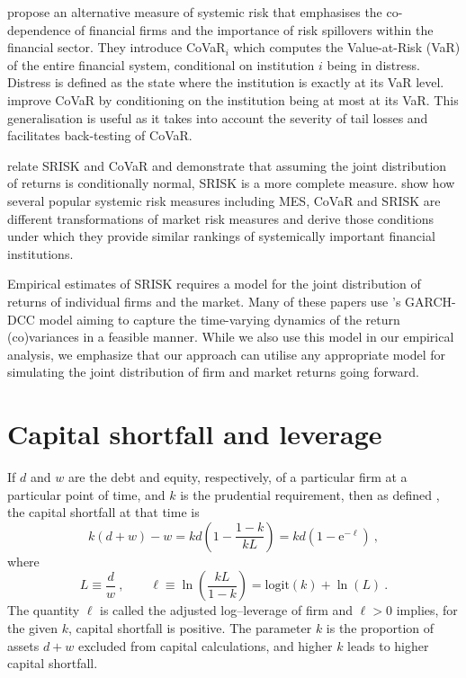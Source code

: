 \documentclass[12pt]{article}
\newcommand{\logit}{\mathrm{logit}}
\newcommand{\e}{\mathrm{e}}
\newcommand{\cq}{\ , \qquad}
\newcommand{\be}[1]{\begin{equation}\label{#1}}
\newcommand{\ee}{\end{equation}}
\begin{document}
\cite{adrian2011covar} propose an alternative measure of systemic risk that emphasises the co-dependence of financial firms and the importance of risk spillovers within the financial sector. They introduce CoVaR$_i$ which computes the Value-at-Risk (VaR) of the entire financial system, conditional on institution $i$ being in distress. Distress is defined as the state where the institution is exactly at its VaR level. \cite{Girardi2013} improve CoVaR by conditioning on the institution being at most at its VaR. This generalisation is useful as it takes into account the severity of tail losses and facilitates back-testing of CoVaR. 

\cite{acharya2012aer} relate SRISK and CoVaR and demonstrate that assuming the joint distribution of returns is conditionally normal, SRISK is a more complete measure. \cite{Benoit2013} show how several popular systemic risk measures including MES, CoVaR and SRISK are different transformations of market risk measures and derive those conditions under which they provide similar rankings of systemically important financial institutions.

Empirical estimates of SRISK  requires a model for the joint distribution of returns of individual firms and the market. Many of these papers use \cite{engle2002dynamic}'s GARCH-DCC model aiming to capture the time-varying dynamics of the return (co)variances in a feasible manner. While we also use this model in our empirical analysis, we emphasize that our approach can utilise any appropriate model for simulating the joint distribution of firm and market returns going forward. 

\section{Capital shortfall and leverage}\label{capshort}

If $d$ and $w$ are the debt and equity, respectively, of a particular  firm at a particular point of time, and $k$ is the prudential requirement,  then  as defined \cite{brownlees2015}, the  capital shortfall at that time is
\be{shortfall}
k (d+w)-w = k d\left(1-\frac{1-k}{kL}\right)=kd\left(1-\e^{-\ell}\right)
\ ,
\ee
where
$$
L\equiv\frac{d}{w}\cq \ell\equiv\ln\left(\frac{kL}{1-k}\right) = \logit(k) + \ln(L) \ .
$$
The quantity $\ell$ is called the adjusted log--leverage of firm  and $\ell>0$ implies, for the given $k$, capital shortfall is positive. The parameter $k$ is the proportion of assets $d+w$ excluded from capital calculations, and higher $ k$ leads to higher capital shortfall.   
\end{document}
